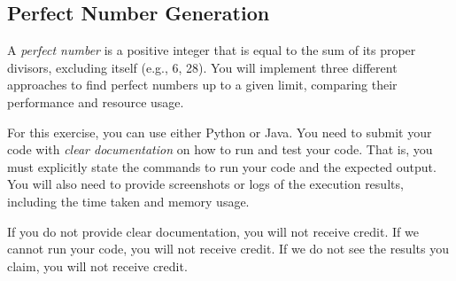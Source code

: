 \documentclass[oneside,11pt,dvipsnames]{book}
\begin{document}
\subsection{Perfect Number Generation}\label{exercise:perfect-number}

A \emph{perfect number} is a positive integer that is equal to the sum of its proper divisors, excluding itself (e.g., 6, 28). You will implement three different approaches to find perfect numbers up to a given limit, comparing their performance and resource usage.  

For this exercise, you can use either Python or Java. You need to submit your code with \emph{clear documentation} on how to run and test your code. That is, you must explicitly state the commands to run your code and the expected output. You will also need to provide screenshots or logs of the execution results, including the time taken and memory usage.  

If you do not provide clear documentation, you will not receive credit. If we cannot run your code, you will not receive credit. If we do not see the results you claim, you will not receive credit. 
\end{document}
